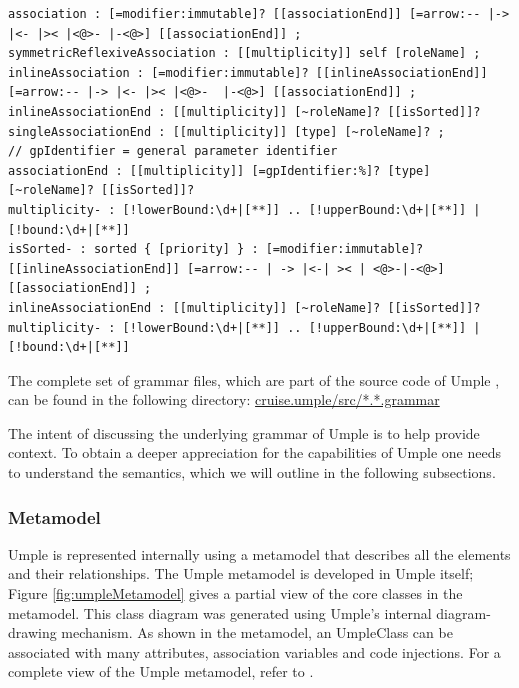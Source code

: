 \begin{lstlisting}[language={grammar}, label=lst:fullGrammar3,caption=Umple grammar for associations]
association : [=modifier:immutable]? [[associationEnd]] [=arrow:-- |-> |<- |>< |<@>- |-<@>] [[associationEnd]] ;
symmetricReflexiveAssociation : [[multiplicity]] self [roleName] ;
inlineAssociation : [=modifier:immutable]? [[inlineAssociationEnd]] [=arrow:-- |-> |<- |>< |<@>-  |-<@>] [[associationEnd]] ;
inlineAssociationEnd : [[multiplicity]] [~roleName]? [[isSorted]]?
singleAssociationEnd : [[multiplicity]] [type] [~roleName]? ;
// gpIdentifier = general parameter identifier
associationEnd : [[multiplicity]] [=gpIdentifier:%]? [type] [~roleName]? [[isSorted]]?
multiplicity- : [!lowerBound:\d+|[**]] .. [!upperBound:\d+|[**]] | [!bound:\d+|[**]]
isSorted- : sorted { [priority] } : [=modifier:immutable]? [[inlineAssociationEnd]] [=arrow:-- | -> |<-| >< | <@>-|-<@>] [[associationEnd]] ;
inlineAssociationEnd : [[multiplicity]] [~roleName]? [[isSorted]]?
multiplicity- : [!lowerBound:\d+|[**]] .. [!upperBound:\d+|[**]] | [!bound:\d+|[**]]
\end{lstlisting}

The complete set of grammar files, which are part of the source code of Umple \cite{umpleRepository}, can be found in the following directory:
\url{cruise.umple/src/*.*.grammar}

The intent of discussing the underlying grammar of Umple is to help provide context. To obtain a deeper appreciation for the capabilities of Umple one needs to understand the semantics, which we will outline in the following subsections.

\subsubsection{Metamodel}
Umple is represented internally using a metamodel that describes all the elements and their relationships. The Umple metamodel is developed in Umple itself; Figure \ref{fig:umpleMetamodel} gives a partial view of the core classes in the metamodel. This class diagram was generated using Umple's internal diagram-drawing mechanism. As shown in the metamodel, an UmpleClass can be associated with many attributes, association variables and code injections. For a complete view of the Umple metamodel, refer to \cite{UmpleMetamodel}.

